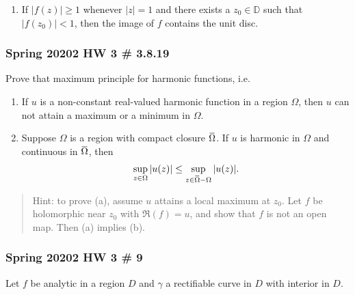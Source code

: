 \begin{enumerate}
\def\labelenumi{\alph{enumi}.}
\setcounter{enumi}{1}
\tightlist
\item
  If \({\left\lvert {f(z)} \right\rvert} \geq 1\) whenever
  \({\left\lvert {z} \right\rvert} = 1\) and there exists a
  \(z_0\in {\mathbb{D}}\) such that
  \({\left\lvert {f(z_0)} \right\rvert} < 1\), then the image of \(f\)
  contains the unit disc.
\end{enumerate}

\hypertarget{spring-20202-hw-3-3.8.19}{%
\subsubsection{Spring 20202 HW 3 \#
3.8.19}\label{spring-20202-hw-3-3.8.19}}

Prove that maximum principle for harmonic functions, i.e.

\begin{enumerate}
\def\labelenumi{\alph{enumi}.}
\item
  If \(u\) is a non-constant real-valued harmonic function in a region
  \(\Omega\), then \(u\) can not attain a maximum or a minimum in
  \(\Omega\).
\item
  Suppose \(\Omega\) is a region with compact closure
  \(\mkern 1.5mu\overline{\mkern-1.5mu\Omega\mkern-1.5mu}\mkern 1.5mu\).
  If \(u\) is harmonic in \(\Omega\) and continuous in
  \(\mkern 1.5mu\overline{\mkern-1.5mu\Omega\mkern-1.5mu}\mkern 1.5mu\),
  then
  \begin{align*}
   \sup _{z \in \Omega}|u(z)| \leq \sup _{z \in \mkern 1.5mu\overline{\mkern-1.5mu\Omega \mkern-1.5mu}\mkern 1.5mu-\Omega}|u(z)|
   .\end{align*}
\end{enumerate}

\begin{quote}
Hint: to prove (a), assume \(u\) attains a local maximum at \(z_0\). Let
\(f\) be holomorphic near \(z_0\) with \(\Re(f) = u\), and show that
\(f\) is not an open map. Then (a) implies (b).
\end{quote}

\hypertarget{spring-20202-hw-3-9}{%
\subsubsection{Spring 20202 HW 3 \# 9}\label{spring-20202-hw-3-9}}

Let \(f\) be analytic in a region \(D\) and \(\gamma\) a rectifiable
curve in \(D\) with interior in \(D\).

